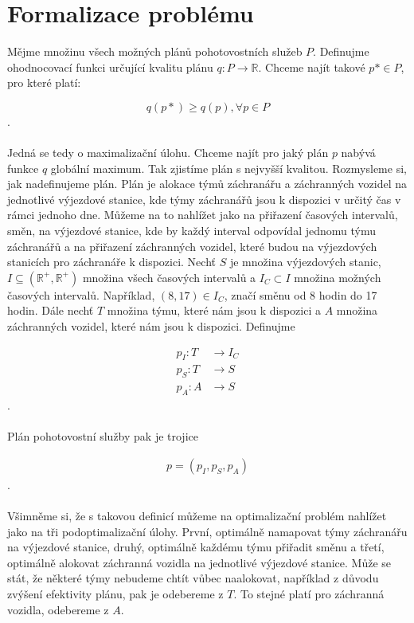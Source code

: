 \clearpage

\section{Formalizace problému}

Mějme množinu všech možných plánů pohotovostních služeb $P$. Definujme ohodnocovací funkci určující kvalitu plánu $q\colon P \rightarrow \mathbb{R}$.
Chceme najít takové $p* \in P$, pro které platí:

$$
q(p*) \geq q(p), \forall p \in P
$$
.
\\
\\
Jedná se tedy o maximalizační úlohu. Chceme najít pro jaký plán $p$ nabývá funkce $q$ globální maximum. Tak zjistíme plán s nejvyšší kvalitou.
Rozmysleme si, jak nadefinujeme plán. Plán je alokace týmů záchranářu a záchranných vozidel na jednotlivé výjezdové stanice, kde týmy záchranářů jsou k dispozici v určitý čas v rámci jednoho dne.
Můžeme na to nahlížet jako na přiřazení časových intervalů, směn, na výjezdové stanice, kde by každý interval odpovídal jednomu týmu záchranářů a na přiřazení záchranných vozidel,
které budou na výjezdových stanicích pro záchranáře k dispozici.
Nechť $S$ je množina výjezdových stanic, $I \subseteq (\mathbb{R^+}, \mathbb{R^+})$ množina všech časových intervalů a $I_C \subset I$ množina možných časových intervalů.
Například, $(8, 17) \in I_C$, značí směnu od 8 hodin do 17 hodin.
Dále nechť $T$ množina týmu, které nám jsou k dispozici a $A$ množina záchranných vozidel, které nám jsou k dispozici. Definujme

\begin{align}
p_I \colon T &\rightarrow I_C \\
p_S \colon T &\rightarrow S \\
p_A \colon A &\rightarrow S 
\end{align}
.
\\
\\
Plán pohotovostní služby pak je trojice

\begin{align}
p = (p_I, p_S, p_A)
\end{align}
.
\\
\\
Všimněme si, že s takovou definicí můžeme na optimalizační problém nahlížet jako na tři podoptimalizační úlohy.
První, optimálně namapovat týmy záchranářu na výjezdové stanice, druhý, optimálně každému týmu přiřadit směnu a třetí, optimálně alokovat záchranná vozidla na jednotlivé výjezdové stanice.
Může se stát, že některé týmy nebudeme chtít vůbec naalokovat, například z důvodu zvýšení efektivity plánu, pak je odebereme z $T$. To stejné platí pro záchranná vozidla, odebereme z $A$.


